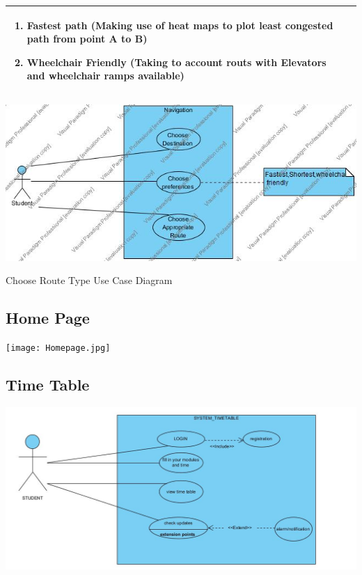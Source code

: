 \documentclass[12pt]{article}
\begin{document}
\begin{tabular}{|p{4cm}|p{10cm}|}
\begin{enumerate}
\begin{enumerate}
	\item Fastest path (Making use of heat maps to plot least congested path from point A to B)

	\item Wheelchair Friendly (Taking to account routs with Elevators and wheelchair ramps available)

	\end{enumerate}

\end{enumerate} \\

\hline



\hline



\end{tabular}



\includegraphics[width=\linewidth]{UseCaseDiagram_ChooseRouteType.jpg}

Choose Route Type Use Case Diagram



	\subsection{Home Page}

	\texttt{[image: Homepage.jpg]}

	

	\subsection{Time Table}

	\includegraphics[width=\linewidth]{timetable.jpg}
\end{document}
